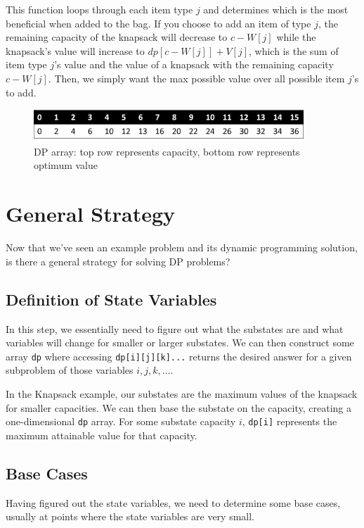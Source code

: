 This function loops through each item type $j$ and determines which is the most beneficial when added to the bag.  If you choose to add an item of type $j$, the remaining capacity of the knapsack will decrease to $c - W[j]$ while the knapsack's value will increase to $dp[c - W[j]] + V[j]$, which is the sum of item type $j$'s value and the value of a knapsack with the remaining capacity $c - W[j]$.  Then, we simply want the max possible value over all possible item $j$'s to add.

\begin{figure}[h]
\begin{center}
\includegraphics[width=4in]{images/knapsack2.png}
\end{center}
\caption{DP array: top row represents capacity, bottom row represents optimum value}
\end{figure}


\section{General Strategy}
Now that we've seen an example problem and its dynamic programming solution, is there a general strategy for solving DP problems?

\subsection{Definition of State Variables}
In this step, we essentially need to figure out what the substates are and what variables will change for smaller or larger substates.  We can then construct some array \verb=dp= where accessing \verb=dp[i][j][k]...= returns the desired answer for a given subproblem of those variables $i, j, k, \ldots$.

In the Knapsack example, our substates are the maximum values of the knapsack for smaller capacities.  We can then base the substate on the capacity, creating a one-dimensional \verb=dp= array.  For some substate capacity $i$, \verb=dp[i]= represents the maximum attainable value for that capacity.

\subsection{Base Cases}
Having figured out the state variables, we need to determine some base cases, usually at points where the state variables are very small.

